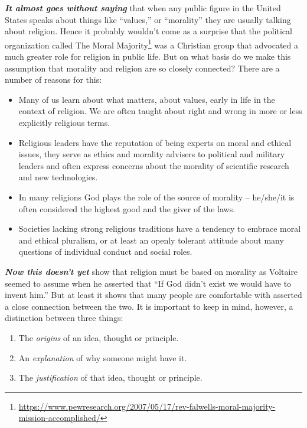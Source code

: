 \documentclass[12pt, openany]{book}
\providecommand{\tightlist}{%
  \setlength{\itemsep}{0pt}\setlength{\parskip}{0pt}}
\renewcommand{\href}[2]{#2\footnote{\url{#1}}}
\begin{document}
\textbf{\emph{It almost goes without saying}} that when any public figure in the United States speaks about things like ``values,'' or ``morality'' they are usually talking about religion. Hence it probably wouldn't come as a surprise that the political organization called \href{https://www.pewresearch.org/2007/05/17/rev-falwells-moral-majority-mission-accomplished/}{The Moral Majority} was a Christian group that advocated a much greater role for religion in public life. But on what basis do we make this assumption that morality and religion are so closely connected? There are a number of reasons for this:

\begin{itemize}
\tightlist
\item
  Many of us learn about what matters, about values, early in life in the context of religion. We are often taught about right and wrong in more or less explicitly religious terms.
\item
  Religious leaders have the reputation of being experts on moral and ethical issues, they serve as ethics and morality advisers to political and military leaders and often express concerns about the morality of scientific research and new technologies.
\item
  In many religions God plays the role of the source of morality -- he/she/it is often considered the highest good and the giver of the laws.
\item
  Societies lacking strong religious traditions have a tendency to embrace moral and ethical pluralism, or at least an openly tolerant attitude about many questions of individual conduct and social roles.
\end{itemize}

\textbf{\emph{Now this doesn't yet}} show that religion must be based on morality as Voltaire seemed to assume when he asserted that ``If God didn't exist we would have to invent him.'' But at least it shows that many people are comfortable with asserted a close connection between the two. It is important to keep in mind, however, a distinction between three things:

\begin{enumerate}
\def\labelenumi{\arabic{enumi}.}
\tightlist
\item
  The \emph{origins} of an idea, thought or principle.
\item
  An \emph{explanation} of why someone might have it.
\item
  The \emph{justification} of that idea, thought or principle.
\end{enumerate}
\end{document}
